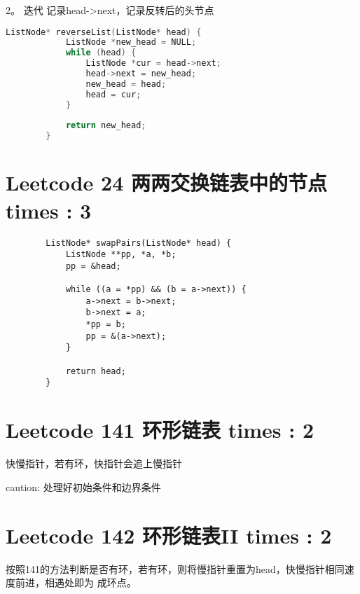 \documentclass[UTF8]{ctexart}
\begin{document}
2。 迭代 记录head->next，记录反转后的头节点
\begin{framed}
	\begin{lstlisting}[language=C++]
		ListNode* reverseList(ListNode* head) {
			ListNode *new_head = NULL;
			while (head) {
				ListNode *cur = head->next;
				head->next = new_head;
				new_head = head;
				head = cur;
			}
	
			return new_head;
		}
	\end{lstlisting}
\end{framed}

\section{Leetcode 24 两两交换链表中的节点 times : 3} 
\begin{framed}
	\begin{lstlisting}
		ListNode* swapPairs(ListNode* head) {
			ListNode **pp, *a, *b;
			pp = &head;

			while ((a = *pp) && (b = a->next)) {
				a->next = b->next;
				b->next = a;
				*pp = b;
				pp = &(a->next);
			}

			return head;
		}
	\end{lstlisting}
\end{framed}

\section{Leetcode 141 环形链表 times : 2}
快慢指针，若有环，快指针会追上慢指针

caution: 处理好初始条件和边界条件

\section{Leetcode 142 环形链表II times : 2}
按照141的方法判断是否有环，若有环，则将慢指针重置为head，快慢指针相同速度前进，相遇处即为
成环点。
\end{document}
